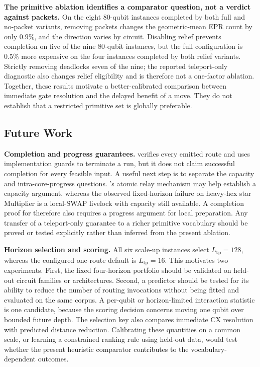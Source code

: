 \textbf{The primitive ablation identifies a comparator question, not a
verdict against packets.} On the eight 80-qubit instances completed by
both full and no-packet variants, removing packets changes the
geometric-mean EPR count by only $0.9\%$, and the direction varies by
circuit. Disabling relief prevents completion on five of the nine 80-qubit
instances, but the full configuration is $0.5\%$ more expensive on the four
instances completed by both relief variants. Strictly removing \TeleGate{}
deadlocks seven of the nine; the reported teleport-only diagnostic also
changes relief eligibility and is therefore not a one-factor ablation.
Together, these
results motivate a better-calibrated comparison between immediate gate
resolution and the delayed benefit of a \TeleData{} move. They do not
establish that a restricted primitive set is globally preferable.

\subsection{Future Work}
\label{sec:future}

\textbf{Completion and progress guarantees.} \PORTER{} verifies every
emitted route and uses implementation guards to terminate a run, but it does
not claim successful completion for every feasible input. A useful next step
is to separate the capacity and intra-core-progress questions. \dSABRE{}'s
atomic relay mechanism may help establish a capacity argument, whereas the
observed fixed-horizon failure on heavy-hex star Multiplier is a local-SWAP
livelock with capacity still available. A completion proof for \PORTER{}
therefore also requires a progress argument for local preparation. Any
transfer of a teleport-only guarantee to a richer primitive vocabulary should
be proved or tested explicitly rather than inferred from the present
ablation.

\textbf{Horizon selection and scoring.} All six scale-up instances
select $L_\mathrm{tp}=128$, whereas the configured one-route default is
$L_\mathrm{tp}=16$. This motivates two experiments. First, the fixed
four-horizon portfolio should be validated on held-out circuit families or
architectures. Second, a predictor should be tested for its ability to
reduce the number of routing invocations without being fitted and evaluated
on the same corpus. A per-qubit or horizon-limited interaction statistic is
one candidate, because the scoring decision concerns moving one qubit over
bounded future depth. The selection key also compares immediate CX
resolution with predicted distance reduction. Calibrating these quantities on
a common scale, or learning a constrained ranking rule using held-out data,
would test whether the present heuristic comparator contributes to the
vocabulary-dependent outcomes.

